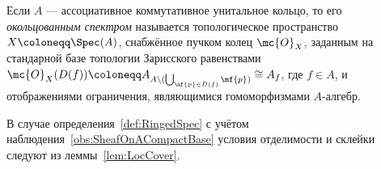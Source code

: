 \documentclass[
	extrafontsizes,
	11pt,
	hyphens,
]{memoir}
\begin{document}
\begin{definition} \label{def:RingedSpec}
Если \(A\) --- ассоциативное коммутативное унитальное кольцо, то его \emph{окольцованным спектром} называется топологическое пространство \(X \coloneqq \Spec(A)\), снабжённое пучком колец \(\mc{O}_X\), заданным на стандарной базе топологии Зарисского равенствами
\(\mc{O}_X(D(f)) \coloneqq A_{A \setminus (\bigcup_{\mf{p} \in D(f)} \mf{p})} \cong A_f\), где \(f \in A\),
и отображениями ограничения, являющимися гомоморфизмами \(A\)-алгебр.
\end{definition}

\begin{remark}
В случае определения~\ref{def:RingedSpec} с учётом наблюдения~\ref{obs:SheafOnACompactBase} условия отделимости и склейки следуют из леммы~\ref{lem:LocCover}.
\end{remark}
\end{document}

